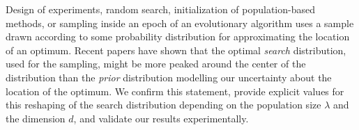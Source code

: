 
 \newcommand{\mtbxx}[1]{\textcolor{black}{#1}}
  \newcommand{\br}[1]{\textcolor{black}{#1}}

\newcommand{\ccc}[1]{\textcolor{black}{#1}}
\newcommand{\cc}[1]{\textcolor{black}{#1}}
\newcommand{\brtwo}[1]{\textcolor{black}{#1}}

\newcommand{\carola}[1]{\textcolor{black}{#1}}
  \newcommand{\olivier}[1]{\textcolor{black}{#1}}






\newcommand{\mlc}[1]{\textcolor{black}{[#1]}}
\newcommand{\ot}[1]{\textcolor{black}{#1}}
\newcommand{\removeme}[1]{\textcolor{black}{#1}}
\newcommand{\TODODimo}[1]{{\color{red} TODO Dimo: #1}}
 
Design of experiments, random search, initialization of population-based methods, or sampling inside an epoch of an evolutionary algorithm uses a sample drawn according to some probability distribution for approximating the location of an optimum. Recent papers have shown that the optimal {\textit{search}} distribution, used for the sampling, might be more peaked around the center of the distribution than the {\textit{prior}} distribution modelling our uncertainty about the location of the optimum.
We confirm this statement, provide explicit values for this reshaping of the search distribution depending on the population size $\lambda$ and the dimension $d$, and validate our results experimentally.

